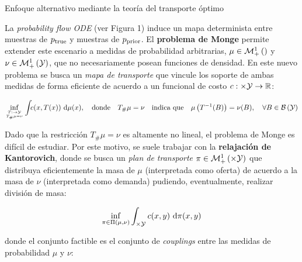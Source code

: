 \documentclass[final]{beamer}
\newlength{\colwidth}
\begin{document}
\begin{frame}[t]
\begin{columns}[t]
\begin{column}{\colwidth}
      \begin{block}{Enfoque alternativo mediante la teoría del transporte óptimo}

        La \textit{probability flow ODE} (ver Figura 1) induce un mapa determinista entre muestras de $p_{\operatorname{true}}$ y muestras de $p_{\operatorname{prior}}$. El \textbf{problema de Monge} permite extender este escenario a medidas de probabilidad arbitrarias, $\mu\in\mathcal{M}_+^1\left(\right)$ y $\nu\in\mathcal{M}_+^1\left(\mathcal{Y}\right)$, que no necesariamente posean funciones de densidad. En este nuevo problema se busca un \textit{mapa de transporte} que vincule los soporte de ambas medidas de forma eficiente de acuerdo a un funcional de costo $c:\times\mathcal{Y}\to\mathbb{R}$:

        \begin{equation*}
          \inf_{\feasible{T:\xspace\to\yspace}{T_\#\mu=\nu}}
          \int_{\xspace} c(x, T(x)) \d\mu(x), 
          \quad\text{donde}\quad
          T_\#\mu=\nu\quad\text{indica que}\quad \mu\parent{T^{-1}(B)} = \nu(B),\quad \forall B\in \borel{\yspace}
        \end{equation*}

        Dado que la restricción $T_\#\mu=\nu$ es altamente no lineal, el problema de Monge es difícil de estudiar. Por este motivo, se suele trabajar con la \textbf{relajación de Kantorovich}, donde se busca un \textit{plan de transporte} $\pi\in\probmeasure{\xspace\times\yspace}$ que distribuya eficientemente la masa de $\mu$ (interpretada como oferta) de acuerdo a la masa de $\nu$ (interpretada como demanda) pudiendo, eventualmente, realizar división de masa:

        \noindent
        \begin{minipage}[t]{0.35\textwidth}
        \end{minipage}%
        \hfill
        \begin{minipage}[t]{0.6\textwidth}
          \vspace{0.5cm}
          \begin{equation}
            \label{eq:kantorovich}
            \inf_{\pi \in \Pi(\mu,\nu)} \int_{\times\mathcal{Y}} c(x, y) \,\operatorname{d}\!\pi(x, y)
          \end{equation}

          donde el conjunto factible es el conjunto de \textit{couplings} entre las medidas de probabilidad $\mu$ y $\nu$:


\end{minipage}
\end{block}
\end{column}
\end{columns}
\end{frame}
\end{document}

